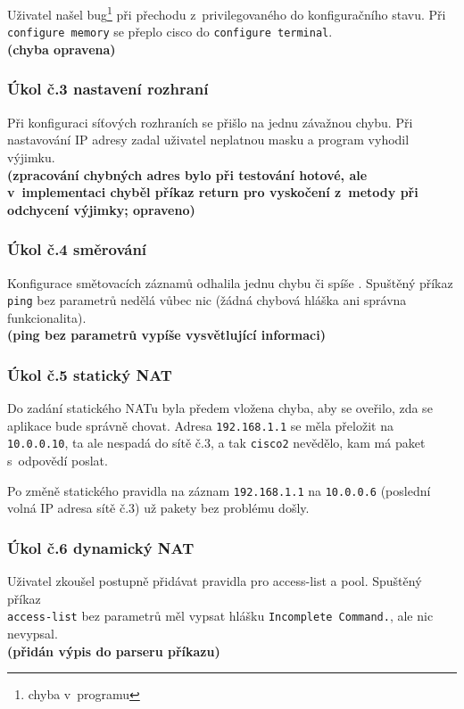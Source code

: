 Uživatel našel bug\footnote{chyba v~programu} při přechodu z~privilegovaného do konfiguračního stavu. Při \\\verb|configure memory| se přeplo cisco do \verb|configure terminal|.
\\\textbf{(chyba opravena)}

\subsubsection{Úkol č.3 nastavení rozhraní}
Při konfiguraci síťových rozhraních se přišlo na jednu závažnou chybu. Při nastavování IP adresy zadal uživatel neplatnou masku a program vyhodil výjimku.
\\\textbf{(zpracování chybných adres bylo při testování hotové, ale v~implementaci chyběl příkaz return pro vyskočení z~metody při odchycení výjimky; opraveno)}

\subsubsection{Úkol č.4 směrování}
Konfigurace smětovacích záznamů odhalila jednu chybu či spíše . Spuštěný příkaz \verb|ping| bez parametrů nedělá vůbec nic (žádná chybová hláška ani správna funkcionalita).
\\\textbf{(ping bez parametrů vypíše vysvětlující informaci)}

\subsubsection{Úkol č.5 statický NAT}
Do zadání statického NATu byla předem vložena chyba, aby se oveřilo, zda se aplikace bude správně chovat. Adresa \verb|192.168.1.1| se měla přeložit na \verb|10.0.0.10|, ta ale nespadá do sítě č.3, a tak \verb|cisco2| nevědělo, kam má paket s~odpovědí poslat.

Po změně statického pravidla na záznam \verb|192.168.1.1| na \verb|10.0.0.6| (poslední volná IP adresa sítě č.3) už pakety bez problému došly.

\subsubsection{Úkol č.6 dynamický NAT}
Uživatel zkoušel postupně přidávat pravidla pro access-list a pool. Spuštěný příkaz \\\verb|access-list| bez parametrů měl vypsat hlášku \verb|Incomplete Command.|, ale nic nevypsal.
\\\textbf{(přidán výpis do parseru příkazu)}

